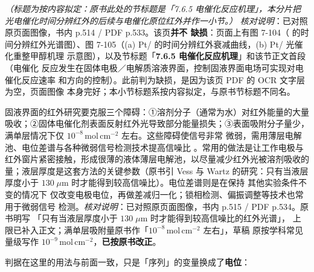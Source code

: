 \emph{（标题为按内容拟定：原书此处的节标题是「7.6.5 电催化反应机理」，本分片把
光电催化时间分辨红外的后续与电催化原位红外并作一小节。）}
\emph{核对说明}：已对照原页面图像，书内 p.514 / PDF p.533。该页\textbf{并不
缺损}：页面上有图 7-104（ 的时间分辨红外光谱图）、图 7-105（(a)
Pt/ 的时间分辨红外衰减曲线，(b) Pt/ 光催化重整甲醇机理
示意图），以及节标题「\textbf{7.6.5 电催化反应机理}」和该节正文首段（电催化
反应发生在固体电极／电解质溶液界面，控制固液界面电场可实现对电催化反应速率
和方向的控制）。此前判为缺损，是因为该页 PDF 的 OCR 文字层为空，页面图像
本身完好；本小节标题系按内容拟定，与原书节标题不同名。

固液界面的红外研究要克服三个障碍：①溶剂分子（通常为水）对红外能量的大量
吸收；②固体电催化剂表面反射红外光导致部分能量损失；③表面吸附分子量少，
满单层情况下仅 $10^{-8}$\,mol\,cm$^{-2}$ 左右。这些障碍使信号非常
微弱，需用薄层电解池、电位差谱与各种微弱信号检测技术提高信噪比
。常用的做法是让工作电极与
红外窗片紧密接触，形成很薄的液体薄层电解池，以尽量减少红外光被溶剂吸收的
量；液层厚度是这套方法的关键参数（原书引 Vess 与 Wartz 的研究：只有当液层
厚度小于 $130\;\mu\mathrm{m}$ 时才能得到较高信噪比）。电位差谱则是在保持
其他实验条件不变的情况下
仅改变电极电位，再做差减归一化；锁相检测、偏振调整等技术也常用于微弱信号
检测。\emph{核对说明}：已对照原页面图像，书内 p.515 / PDF p.534。原书明写
「只有当液层厚度小于 $130\;\mu\mathrm{m}$ 时才能得到较高信噪比的红外光谱」，
上限已补入正文；满单层吸附量原书作「$10^{-8}$\,mol\,cm$^{-2}$ 左右」，草稿
原按学科常见量级写作 $10^{-9}$\,mol\,cm$^{-2}$，\textbf{已按原书改正}。

判据在这里的用法与前面一致，只是「序列」的变量换成了\textbf{电位}：

